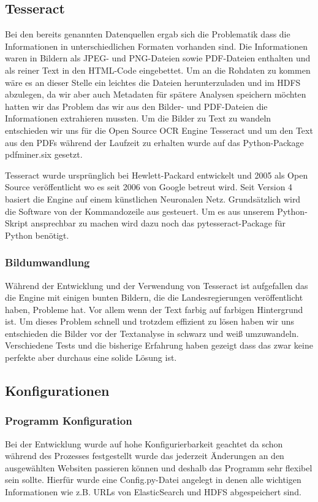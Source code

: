 \documentclass[12pt,oneside,a4paper,parskip]{scrbook}
\begin{document}
\subsection{Tesseract}

Bei den bereits genannten Datenquellen ergab sich die Problematik dass die Informationen in unterschiedlichen Formaten vorhanden sind. Die Informationen waren in Bildern als JPEG- und PNG-Dateien sowie PDF-Dateien enthalten und als reiner Text in den HTML-Code eingebettet. Um an die Rohdaten zu kommen wäre es an dieser Stelle ein leichtes die Dateien herunterzuladen und im HDFS abzulegen, da wir aber auch Metadaten für spätere Analysen speichern möchten hatten wir das Problem das wir aus den Bilder- und PDF-Dateien die Informationen extrahieren mussten. Um die Bilder zu Text zu wandeln entschieden wir uns für die Open Source OCR Engine Tesseract und um den Text aus den PDFs während der Laufzeit zu erhalten wurde auf das Python-Package pdfminer.six gesetzt.

Tesseract wurde ursprünglich bei Hewlett-Packard entwickelt und 2005 als Open Source veröffentlicht wo es seit 2006 von Google betreut wird.
Seit Version 4 basiert die Engine auf einem künstlichen Neuronalen Netz. Grundsätzlich wird die Software von der Kommandozeile aus gesteuert. Um es aus unserem Python-Skript ansprechbar zu machen wird dazu noch das pytesseract-Package für Python benötigt.

\subsubsection{Bildumwandlung}\label{sec:sub:sub:bild}
Während der Entwicklung und der Verwendung von Tesseract ist aufgefallen das die Engine mit einigen bunten Bildern, die die Landesregierungen veröffentlicht haben, Probleme hat. Vor allem wenn der Text farbig auf farbigen Hintergrund ist. Um dieses Problem schnell und trotzdem effizient zu lösen haben wir uns entschieden die Bilder vor der Textanalyse in schwarz und weiß umzuwandeln. Verschiedene Tests und die bisherige Erfahrung haben gezeigt dass das zwar keine perfekte aber durchaus eine solide Lösung ist.

\pagebreak
\subsection{Konfigurationen}

\subsubsection{Programm Konfiguration}
Bei der Entwicklung wurde auf hohe Konfigurierbarkeit geachtet da schon während des Prozesses festgestellt wurde das jederzeit Änderungen an den ausgewählten Websiten passieren können und deshalb das Programm sehr flexibel sein sollte. Hierfür wurde eine Config.py-Datei angelegt in denen alle wichtigen Informationen wie z.B. URLs von ElasticSearch und HDFS abgespeichert sind.
\end{document}
